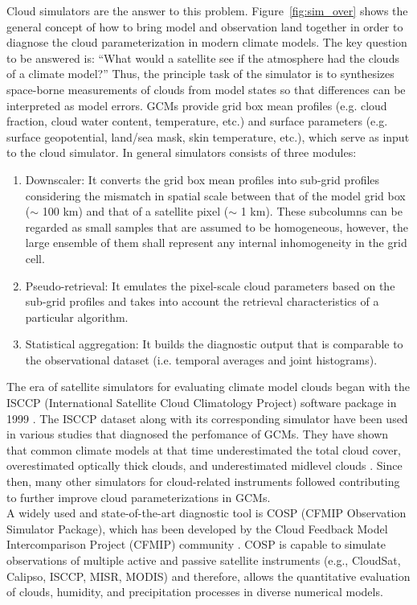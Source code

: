 Cloud simulators are the answer to this problem. 
Figure~\ref{fig:sim_over} shows the general concept of how to bring model and observation land 
together in order to diagnose the cloud parameterization in modern climate models.
The key question to be answered is: 
``What would a satellite see if the atmosphere had the clouds of a climate model?'' 
Thus, the principle task of the simulator is to synthesizes space-borne measurements of clouds 
from model states so that differences can be interpreted as model errors.
GCMs provide grid box mean profiles (e.g. cloud fraction, cloud water content, temperature, etc.)
and surface parameters (e.g. surface geopotential, land/sea mask, skin temperature, etc.),
which serve as input to the cloud simulator.
In general simulators consists of three modules:
\begin{enumerate}\setlength\itemsep{0.2em}
 \item Downscaler: It converts the grid box mean profiles into sub-grid profiles considering
 the mismatch in spatial scale between that of the model grid box ($\sim$ 100 km) and 
 that of a satellite pixel ($\sim$ 1 km). These subcolumns can be regarded as small samples that
 are assumed to be homogeneous, however, the large ensemble of them shall represent any 
 internal inhomogeneity in the grid cell.
 \item Pseudo-retrieval: It emulates the pixel-scale cloud parameters based on the sub-grid profiles
 and takes into account the retrieval characteristics of a particular algorithm.
 \item Statistical aggregation: It builds the diagnostic output that is comparable to the 
 observational dataset (i.e. temporal averages and joint histograms).
\end{enumerate}

The era of satellite simulators for evaluating climate model clouds began with the 
ISCCP (International Satellite Cloud Climatology Project) software package in 1999 \cite{Klein1999}.
The ISCCP dataset \cite{Rossow1999} along with its corresponding simulator have been used
in various studies that diagnosed the perfomance of GCMs. They have shown that common climate models
at that time underestimated the total cloud cover, overestimated optically thick clouds, and
underestimated midlevel clouds \cite{Kay2012}. 
Since then, many other simulators for cloud-related instruments \cite{Pincus2012} 
followed contributing to further improve cloud parameterizations in GCMs.\\
A widely used and state-of-the-art diagnostic tool is COSP (CFMIP Observation Simulator Package), 
which has been developed by the Cloud Feedback Model Intercomparison Project (CFMIP) community \cite{Bodas2011}.
COSP is capable to simulate observations of multiple active and passive satellite instruments
(e.g., CloudSat, Calipso, ISCCP, MISR, MODIS) and therefore, allows the quantitative evaluation of 
clouds, humidity, and precipitation processes in diverse numerical models.

